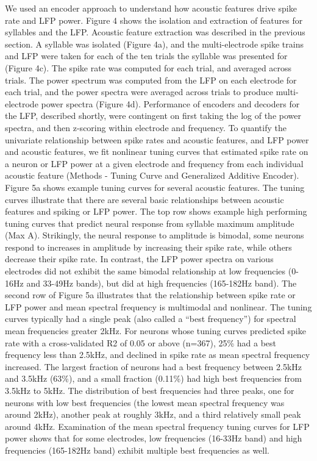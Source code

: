 We used an encoder approach to understand how acoustic features drive spike rate and LFP power. Figure 4 shows the isolation and extraction of features for syllables and the LFP. Acoustic feature extraction was described in the previous section. A syllable was isolated (Figure 4a), and the multi-electrode spike trains and LFP were taken for each of the ten trials the syllable was presented for (Figure 4c). The spike rate was computed for each trial, and averaged across trials. The power spectrum was computed from the LFP on each electrode for each trial, and the power spectra were averaged across trials to produce multi-electrode power spectra (Figure 4d). Performance of encoders and decoders for the LFP, described shortly, were contingent on first taking the log of the power spectra, and then z-scoring within electrode and frequency.
To quantify the univariate relationship between spike rates and acoustic features, and LFP power and acoustic features, we fit nonlinear tuning curves that estimated spike rate on a neuron or LFP power at a given electrode and frequency from each individual acoustic feature (Methods - Tuning Curve and Generalized Additive Encoder). Figure 5a shows example tuning curves for several acoustic features. The tuning curves illustrate that there are several basic relationships between acoustic features and spiking or LFP power. The top row shows example high performing tuning curves that predict neural response from syllable maximum amplitude (Max A). Strikingly, the neural response to amplitude is bimodal, some neurons respond to increases in amplitude by increasing their spike rate, while others decrease their spike rate. In contrast, the LFP power spectra on various electrodes did not exhibit the same bimodal relationship at low frequencies (0-16Hz and 33-49Hz bands), but did at high frequencies (165-182Hz band).
The second row of Figure 5a illustrates that the relationship between spike rate or LFP power and mean spectral frequency is multimodal and nonlinear. The tuning curves typically had a single peak (also called a “best frequency”) for spectral mean frequencies greater 2kHz. For neurons whose tuning curves predicted spike rate with a cross-validated R2 of 0.05 or above (n=367), 25\% had a best frequency less than 2.5kHz, and declined in spike rate as mean spectral frequency increased. The largest fraction of neurons had a best frequency between 2.5kHz and 3.5kHz (63\%), and a small fraction (0.11\%) had high best frequencies from 3.5kHz to 5kHz. The distribution of best frequencies had three peaks, one for neurons with low best frequencies (the lowest mean spectral frequency was around 2kHz), another peak at roughly 3kHz, and a third relatively small peak around 4kHz. Examination of the mean spectral frequency tuning curves for LFP power shows that for some electrodes, low frequencies (16-33Hz band) and high frequencies (165-182Hz band) exhibit multiple best frequencies as well.
